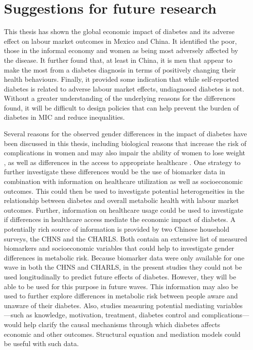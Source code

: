 \section{Suggestions for future research}

This thesis has shown the global economic impact of diabetes and its adverse effect on labour market outcomes in Mexico and China. It identified the poor, those in the informal economy and women as being most adversely affected by the disease. It further found that, at least in China, it is men that appear to make the most from a diabetes diagnosis in terms of positively changing their health behaviours. Finally, it provided some indication that while self-reported diabetes is related to adverse labour market effects, undiagnosed diabetes is not. Without a greater understanding of the underlying reasons for the differences found, it will be difficult to design policies that can help prevent the burden of diabetes in \ac{MIC} and reduce inequalities.

Several reasons for the observed gender differences in the impact of diabetes have been discussed in this thesis, including biological reasons that increase the risk of complications in women \parencite{Peters2014,Peters2015,Arnetz2014,Roche2013,Policardo2014,Catalan2015,Engelmann2016,Seghieri2015} and may also impair the ability of women to lose weight \parencite{Penno2013}, as well as differences in the access to appropriate healthcare \parencite{Penno2013}. One strategy to further investigate these differences would be the use of biomarker data in combination with information on healthcare utilization as well as socioeconomic outcomes. This could then be used to investigate potential heterogeneities in the relationship between diabetes and overall metabolic health with labour market outcomes. Further, information on healthcare usage could be used to investigate if differences in healthcare access mediate the economic impact of diabetes. A potentially rich source of information is provided by two Chinese household surveys, the \acf{CHNS} and the \acf{CHARLS}. Both contain an extensive list of measured biomarkers and socioeconomic variables that could help to investigate gender differences in metabolic risk. Because biomarker data were only available for one wave in both the \ac{CHNS} and \ac{CHARLS}, in the present studies they could not be used longitudinally to predict future effects of diabetes. However, they will be able to be used for this purpose in future waves. This information may also be used to further explore differences in metabolic risk between people aware and unaware of their diabetes. Also, studies measuring potential mediating variables---such as knowledge, motivation, treatment, diabetes control and complications---would help clarify the causal mechanisms through which diabetes affects economic and other outcomes. Structural equation and mediation models could be useful with such data. 

